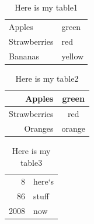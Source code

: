 \documentclass[a4paper,12pt]{article}
\begin{document}

        \begin{table}[H]
            \centering
            \begin{tabular}{|l|l|}
                Apples       & green \\
                Strawberries & red    \\
                Bananas      & yellow  \\
            \end{tabular}
            \caption{Here is my table1}
        \end{table}


        \begin{table}[H]
            \centering
            \begin{tabular}{rc}
                Apples                       &  green   \\
                \hline
                Strawberries                 &  red      \\
                \cline{1-1} Oranges          &  orange   \\
            \end{tabular}
            \caption{Here is my table2}
        \end{table}


       \begin{table}[H]
            \centering
            \begin{tabular}{|r|l|}
                \hline
                8                &  here`s   \\
                \cline{2-2} 86   &  stuff    \\
                \hline
                \hline
                2008             &   now     \\
                \hline
            \end{tabular}
            \caption{Here is my table3}
        \end{table}
    
\end{document}
